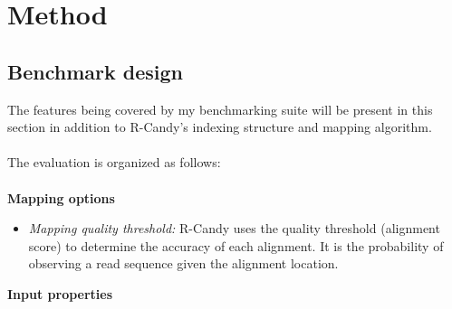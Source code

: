 \documentclass[11pt,a4paper]{report}
\begin{document}

\section{Method}


\subsection{Benchmark design}

The features being covered by my benchmarking suite will be present in this section in addition to R-Candy's indexing structure and mapping algorithm.
\\\\
The evaluation is organized as follows: 
\\\\
\textbf{Mapping options}


\begin{itemize}

 \item \emph{Mapping quality threshold:} R-Candy uses the quality threshold (alignment score) to determine the accuracy of each alignment. 
 It is the probability of observing a read sequence given the alignment location. 

\end{itemize}
\textbf{Input properties}
\end{document}
